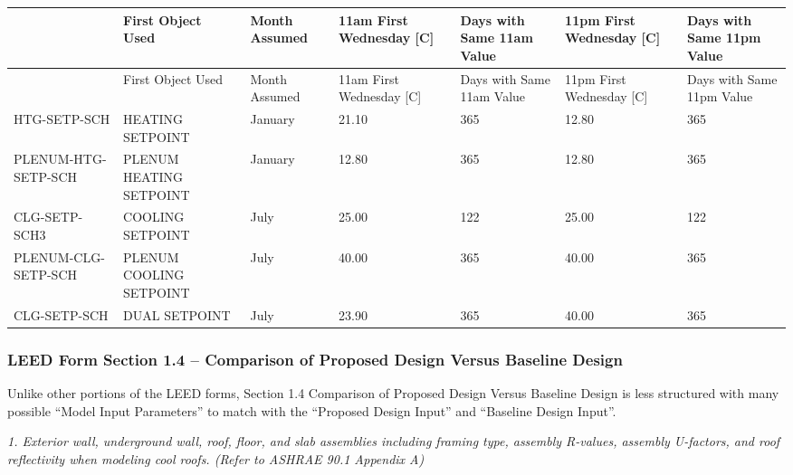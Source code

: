 \begin{longtable}[c]{>{\raggedright}p{0.85in}>{\raggedright}p{0.85in}>{\raggedright}p{0.85in}>{\raggedright}p{0.85in}>{\raggedright}p{0.85in}>{\raggedright}p{0.85in}>{\raggedright}p{0.85in}}
\toprule 
 & First Object Used     & Month Assumed & 11am First Wednesday [C] & Days with Same 11am Value & 11pm First Wednesday [C] & Days with Same 11pm Value \tabularnewline
\midrule
\endfirsthead

\toprule 
 & First Object Used     & Month Assumed & 11am First Wednesday [C] & Days with Same 11am Value & 11pm First Wednesday [C] & Days with Same 11pm Value \tabularnewline
\midrule
\endhead

    HTG-SETP-SCH       & HEATING SETPOINT       & January       &        21.10             &          365              &        12.80             &          365              \tabularnewline
    PLENUM-HTG-SETP-SCH & PLENUM HEATING SETPOINT & January       &        12.80             &          365              &        12.80             &          365              \tabularnewline
    CLG-SETP-SCH3      & COOLING SETPOINT       & July          &        25.00             &          122              &        25.00             &          122              \tabularnewline
    PLENUM-CLG-SETP-SCH & PLENUM COOLING SETPOINT & July          &        40.00             &          365              &        40.00             &          365              \tabularnewline
    CLG-SETP-SCH       & DUAL SETPOINT          & July          &        23.90             &          365              &        40.00             &          365              \tabularnewline

\bottomrule
\end{longtable}


\subsubsection{LEED Form Section 1.4 -- Comparison of Proposed Design Versus Baseline Design}\label{leed-form-section-1.4-comparison-of-proposed-design-versus-baseline-design}

Unlike other portions of the LEED forms, Section 1.4 Comparison of Proposed Design Versus Baseline Design is less structured with many possible ``Model Input Parameters'' to match with the ``Proposed Design Input'' and ``Baseline Design Input''.

\emph{1. Exterior wall, underground wall, roof, floor, and slab assemblies including framing type, assembly R-values, assembly U-factors, and roof reflectivity when modeling cool roofs. (Refer to ASHRAE 90.1 Appendix A)}

